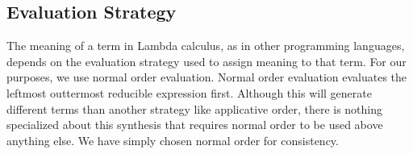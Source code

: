 \subsection{Evaluation Strategy}

The meaning of a term in Lambda calculus, as in other programming languages,
  depends on the evaluation strategy used to assign meaning to that term.
For our purposes, we use normal order evaluation.
Normal order evaluation evaluates the leftmost outtermost reducible
  expression first.
Although this will generate different terms than another strategy like
  applicative order, there is nothing specialized about this synthesis
  that requires normal order to be used above anything else.
We have simply chosen normal order for consistency.
